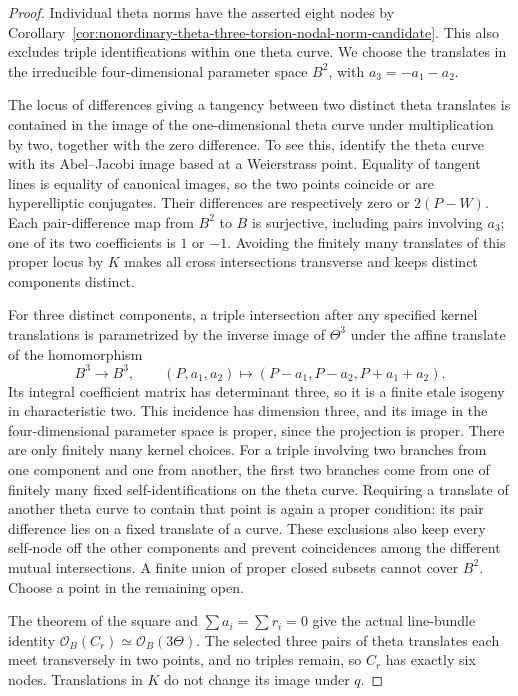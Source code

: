 \begin{proof}
Individual theta norms have the asserted eight nodes by
Corollary~\ref{cor:nonordinary-theta-three-torsion-nodal-norm-candidate}.
This also excludes triple identifications within one theta curve.
We choose the translates in the irreducible four-dimensional
parameter space $B^2$, with $a_3=-a_1-a_2$.

The locus of differences giving a tangency between two distinct
theta translates is contained in the image of the one-dimensional
theta curve under multiplication by two, together with the zero
difference. To see this, identify the theta curve with its
Abel--Jacobi image based at a Weierstrass point. Equality of tangent
lines is equality of canonical images, so the two points coincide
or are hyperelliptic conjugates. Their differences are respectively
zero or $2(P-W)$. Each pair-difference map from $B^2$ to $B$ is
surjective, including pairs involving $a_3$; one of its two
coefficients is $1$ or $-1$. Avoiding the finitely many translates
of this proper locus by $K$ makes all cross intersections transverse
and keeps distinct components distinct.

For three distinct components, a triple intersection after any
specified kernel translations is parametrized by the inverse image
of $\Theta^3$ under the affine translate of the homomorphism
\[
 B^3\longrightarrow B^3,\qquad
 (P,a_1,a_2)\longmapsto(P-a_1,P-a_2,P+a_1+a_2).
\]
Its integral coefficient matrix has determinant three, so it is
a finite etale isogeny in characteristic two. This incidence has
dimension three, and its image in the four-dimensional parameter
space is proper, since the projection is proper. There are only
finitely many kernel choices. For a triple involving two branches
from one component and one from another, the first two branches
come from one of finitely many fixed self-identifications on the
theta curve. Requiring a translate of another theta curve to contain
that point is again a proper condition: its pair difference lies
on a fixed translate of a curve. These exclusions also keep every
self-node off the other components and prevent coincidences among
the different mutual intersections. A finite union of proper closed
subsets cannot cover $B^2$. Choose a point in the remaining open.

The theorem of the square and $\sum a_i=\sum r_i=0$ give the actual
line-bundle identity $\mathcal O_B(C_r)\simeq\mathcal O_B(3\Theta)$.
The selected three pairs of theta translates each meet transversely
in two points, and no triples remain, so $C_r$ has exactly six nodes.
Translations in $K$ do not change its image under $q$.


\end{proof}
